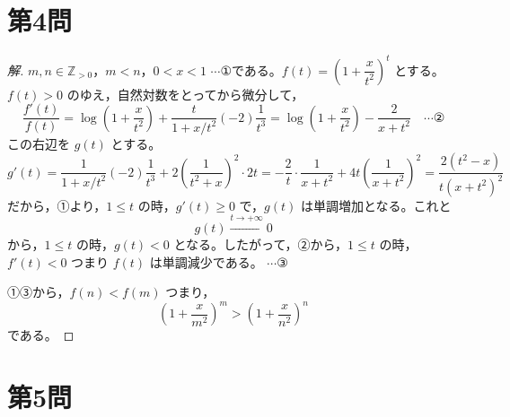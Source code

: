 \documentclass[../main.tex]{subfiles}
\begin{document}
\newpage

\section*{第4問}

\begin{proof}[解]
  $m,n\in\mathbb{Z}_{>0}$，$m<n$，$0<x<1$ $\cdots$①である。$f(t)=\left(1+\dfrac{x}{t^2}\right)^t$ とする。$f(t)>0$ のゆえ，自然対数をとってから微分して，
  \[
    \frac{f'(t)}{f(t)}=\log\left(1+\frac{x}{t^2}\right)+\frac{t}{1+x/t^2}(-2)\frac{1}{t^3} = \log\left(1+\frac{x}{t^2}\right)-\frac{2}{x+t^2} \quad \cdots \text{②}
  \]
  この右辺を $g(t)$ とする。
  \[
    g'(t)=\frac{1}{1+x/t^2}(-2)\frac{1}{t^3}+2\left(\frac{1}{t^2+x}\right)^2\cdot2t = -\frac2t\cdot\frac{1}{x+t^2}+4t\left(\frac{1}{x+t^2}\right)^2 = \frac{2(t^2-x)}{t(x+t^2)^2}
  \]
  だから，①より，$1\le t$ の時，$g'(t)\ge0$ で，$g(t)$ は単調増加となる。これと
  \[
    g(t)\xrightarrow{t\to+\infty}0
  \]
  から，$1\le t$ の時，$g(t)<0$ となる。したがって，②から，$1\le t$ の時，$f'(t)<0$ つまり $f(t)$ は単調減少である。 $\cdots$③

  ①③から，$f(n)<f(m)$ つまり，
  \[
    \left(1+\frac{x}{m^2}\right)^m>\left(1+\frac{x}{n^2}\right)^n
  \]
  である。
\end{proof}

\newpage

\section*{第5問}
\end{document}
